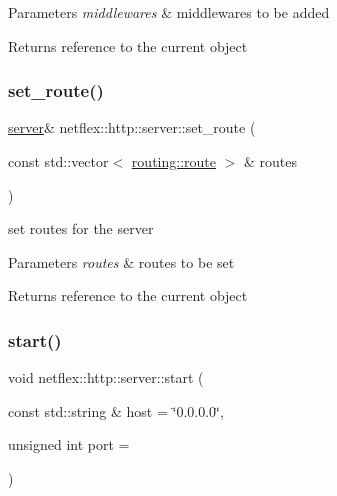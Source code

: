 \begin{DoxyParams}{Parameters}
{\em middlewares} & middlewares to be added \\
\hline
\end{DoxyParams}
\begin{DoxyReturn}{Returns}
reference to the current object 
\end{DoxyReturn}
\mbox{\label{classnetflex_1_1http_1_1server_ac55de13a22c11bbf5a93c5e105e2bf0b}} 
\subsubsection{\texorpdfstring{set\+\_\+route()}{set\_route()}}
{\footnotesize\ttfamily \hyperlink{classnetflex_1_1http_1_1server}{server}\& netflex\+::http\+::server\+::set\+\_\+route (\begin{DoxyParamCaption}\item[{const std\+::vector$<$ \hyperlink{classnetflex_1_1routing_1_1route}{routing\+::route} $>$ \&}]{routes }\end{DoxyParamCaption})}

set routes for the server


\begin{DoxyParams}{Parameters}
{\em routes} & routes to be set \\
\hline
\end{DoxyParams}
\begin{DoxyReturn}{Returns}
reference to the current object 
\end{DoxyReturn}
\mbox{\label{classnetflex_1_1http_1_1server_a2eb01cb96d5ebe6c9ddc25eea32b14d0}} 
\subsubsection{\texorpdfstring{start()}{start()}}
{\footnotesize\ttfamily void netflex\+::http\+::server\+::start (\begin{DoxyParamCaption}\item[{const std\+::string \&}]{host = {\ttfamily \char`\"{}0.0.0.0\char`\"{}},  }\item[{unsigned int}]{port = {} }\end{DoxyParamCaption})}

